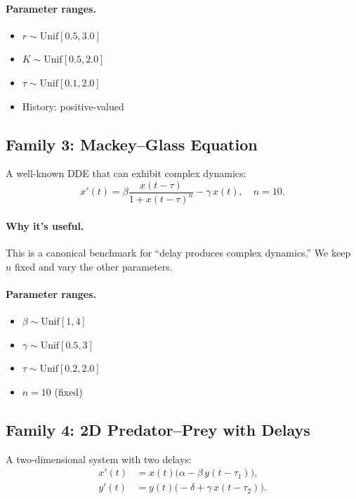 \paragraph{Parameter ranges.}
\begin{itemize}
  \item $r \sim \mathrm{Unif}[0.5, 3.0]$
  \item $K \sim \mathrm{Unif}[0.5, 2.0]$
  \item $\tau \sim \mathrm{Unif}[0.1, 2.0]$
  \item History: positive-valued
\end{itemize}

\subsection{Family 3: Mackey--Glass Equation}

A well-known DDE that can exhibit complex dynamics:
\begin{equation}
  x'(t) = \beta \frac{x(t-\tau)}{1 + x(t-\tau)^n} - \gamma \, x(t), \quad n = 10.
\end{equation}

\paragraph{Why it's useful.}
This is a canonical benchmark for ``delay produces complex dynamics.'' We keep $n$ fixed
and vary the other parameters.

\paragraph{Parameter ranges.}
\begin{itemize}
  \item $\beta \sim \mathrm{Unif}[1, 4]$
  \item $\gamma \sim \mathrm{Unif}[0.5, 3]$
  \item $\tau \sim \mathrm{Unif}[0.2, 2.0]$
  \item $n = 10$ (fixed)
\end{itemize}

\subsection{Family 4: 2D Predator--Prey with Delays}

A two-dimensional system with two delays:
\begin{align}
  x'(t) &= x(t) \bigl(\alpha - \beta \, y(t-\tau_1)\bigr), \\
  y'(t) &= y(t) \bigl(-\delta + \gamma \, x(t-\tau_2)\bigr).
\end{align}

